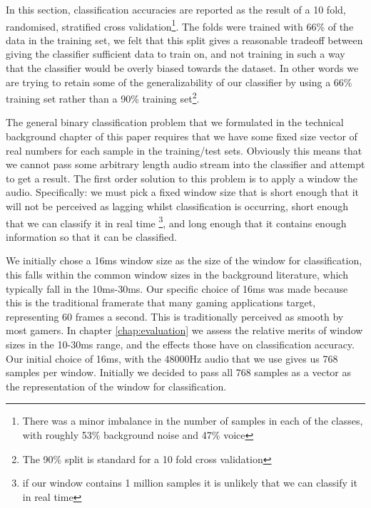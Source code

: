 \documentclass[ %
                    author={Sam Phippen},
                supervisor={Dr. Rafal Bogacz},
                     title={Real time voice activity detectors in noisy personal computing environments},
                  subtitle={},
                    degree={MEng},
                      year={2012} ]{thesis}
\begin{document}
In this section, classification accuracies are reported as the result of a 10
fold, randomised, stratified cross validation\footnote{There was a minor
    imbalance in the number of samples in each of the classes, with roughly
    53\% background noise and 47\% voice}.  The folds were trained with 66\% of
    the data in the training set, we felt that this split gives a reasonable
    tradeoff between giving the classifier sufficient data to train on, and not
    training in such a way that the classifier would be overly biased towards
    the dataset. In other words we are trying to retain some of the
    generalizability of our classifier by using a 66\% training set rather than
    a 90\% training set\footnote{The 90\% split is standard for a 10 fold cross
validation}.

The general binary classification problem that we formulated in the technical
background chapter of this paper requires that we have some fixed size vector
of real numbers for each sample in the training/test sets. Obviously this means
that we cannot pass some arbitrary length audio stream into the classifier and
attempt to get a result. The first order solution to this problem is to apply a
window the audio. Specifically: we must pick a fixed window size that is short
enough that it will not be perceived as lagging whilst classification is
occurring, short enough that we can classify it in real time \footnote{if our
window contains 1 million samples it is unlikely that we can classify it in
real time}, and long enough that it contains enough information so that it can
be classified.

We initially chose a 16ms window size as the size of the window for
classification, this falls within the common window sizes in the background
literature, which typically fall in the 10ms-30ms. Our specific choice of 16ms
was made because this is the traditional framerate that many gaming
applications target, representing 60 frames a second. This is traditionally
perceived as smooth by most gamers. In chapter \ref{chap:evaluation} we assess %
the relative merits of window sizes in the 10-30ms range, and the effects those
have on classification accuracy. Our initial choice of 16ms, with the 48000Hz
audio that we use gives us 768 samples per window. Initially we decided to pass
all 768 samples as a vector as the representation of the window for
classification.
\end{document}

